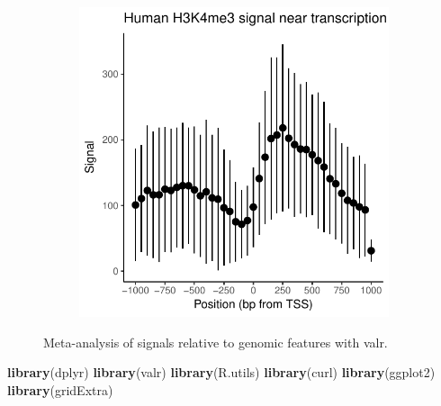 \documentclass[9pt,a4paper]{extarticle}
\renewcommand{\KeywordTok}[1]{\textbf{{#1}}}
\renewcommand{\NormalTok}[1]{{#1}}
\begin{document}
\begin{figure}
\begin{subfigure}[b]{0.5\textwidth}
        \includegraphics[width=\textwidth]{demo-tss-1.pdf}
        \label{fig:meta_gene_out}
    \end{subfigure}
\caption{\label{fig:your-figure}Meta-analysis of signals relative to genomic features with valr.}
\end{figure}








\begin{Shaded}
\begin{Highlighting}[]
\KeywordTok{library}\NormalTok{(dplyr)}
\KeywordTok{library}\NormalTok{(valr)}
\KeywordTok{library}\NormalTok{(R.utils)}
\KeywordTok{library}\NormalTok{(curl)}
\KeywordTok{library}\NormalTok{(ggplot2)}
\KeywordTok{library}\NormalTok{(gridExtra)}
\end{Highlighting}
\end{Shaded}
\end{document}
